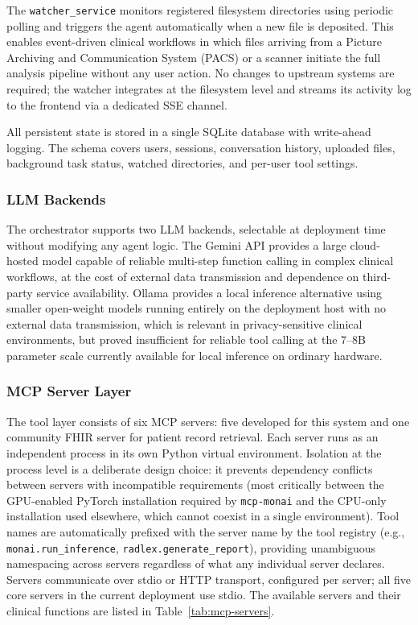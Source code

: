 \documentclass[conference]{IEEEtran}
\begin{document}
The \texttt{watcher\_service} monitors registered filesystem
directories using periodic polling and triggers the agent automatically
when a new file is deposited.
This enables event-driven clinical
workflows in which files arriving from a Picture Archiving and Communication System (PACS) or a scanner
initiate the full analysis pipeline without any user action. No changes
to upstream systems are required; the watcher integrates at the
filesystem level and streams its activity log to the frontend via a
dedicated SSE channel.

All persistent state is stored in a single SQLite database with write-ahead logging. The schema covers users, sessions, conversation history,
uploaded files, background task status, watched directories, and
per-user tool settings.

\subsubsection*{LLM Backends}
The orchestrator supports two LLM backends, selectable at deployment
time without modifying any agent logic.
The Gemini API provides a
large cloud-hosted model capable of reliable multi-step function
calling in complex clinical workflows, at the cost of external data
transmission and dependence on third-party service availability.
Ollama provides a local inference
alternative using smaller open-weight models running entirely on the
deployment host with no external data transmission, which is relevant
in privacy-sensitive clinical environments, but proved insufficient for
reliable tool calling at the 7--8B parameter scale currently available
for local inference on ordinary hardware.

\subsubsection*{MCP Server Layer}
The tool layer consists of six MCP servers: five developed for this system and one community FHIR server for patient record retrieval. Each server runs as an
independent process in its own Python virtual environment.
Isolation at the process level is a deliberate design choice: it
prevents dependency conflicts between servers with incompatible
requirements (most critically between the GPU-enabled PyTorch
installation required by \texttt{mcp-monai} and the CPU-only
installation used elsewhere, which cannot coexist in a single
environment).
Tool names are automatically prefixed with the server name by the tool registry
(e.g., \texttt{monai.run\_inference}, \texttt{radlex.generate\_report}),
providing unambiguous namespacing across servers regardless of what any individual server declares.
Servers communicate over stdio or HTTP transport, configured per server; all five core servers in the current deployment use stdio. The available servers and their
clinical functions are listed in Table~\ref{tab:mcp-servers}.
\end{document}

